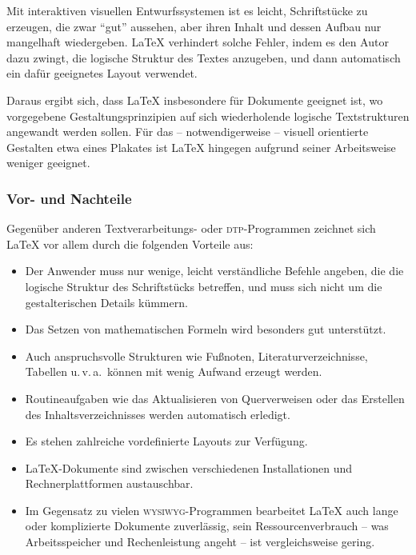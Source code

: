 Mit interaktiven visuellen Entwurfssystemen ist es leicht,  
Schriftstücke zu erzeugen, die zwar \enquote{gut} aussehen,
aber ihren Inhalt und dessen Aufbau nur mangelhaft wiedergeben.
\LaTeX{} verhindert solche
Fehler, indem es den Autor dazu zwingt, die logische
Struktur des Textes anzugeben, und dann automatisch ein dafür
geeignetes Layout verwendet.

Daraus ergibt sich, dass \LaTeX{} insbesondere für Dokumente geeignet 
ist, wo vorgegebene Gestaltungsprinzipien auf sich wiederholende
logische Textstrukturen angewandt werden sollen. 
Für das -- notwendigerweise -- visuell orientierte Gestalten
etwa eines Plakates ist \LaTeX{} hingegen 
aufgrund seiner Arbeitsweise weniger geeignet.

\subsubsection{Vor- und Nachteile}

Gegenüber anderen Textverarbeitungs- oder \textsc{dtp}-Programmen 
zeichnet sich \LaTeX{} vor allem durch die folgenden Vorteile aus:

\begin{itemize}
\item Der Anwender muss nur wenige, leicht verständliche Befehle
  angeben, die die logische Struktur des Schriftstücks
  betreffen, und muss sich nicht um die gestalterischen Details
  kümmern.
\item Das Setzen von mathematischen Formeln wird besonders gut
  unterstützt.
\item Auch anspruchsvolle Strukturen wie Fußnoten, Literaturverzeichnisse,
  Tabellen u.\,v.\,a.\  können mit wenig Aufwand erzeugt werden.
\item Routineaufgaben wie das Aktualisieren von Querverweisen
 oder das Erstellen des Inhaltsverzeichnisses 
 werden automatisch erledigt.
\item Es stehen zahlreiche vordefinierte Layouts zur Verfügung.
\item \LaTeX-Dokumente sind zwischen verschiedenen Installationen und
 Rechnerplattformen austauschbar.
\item Im Gegensatz zu vielen \textsc{wysiwyg}-Programmen bearbeitet \LaTeX{} auch
  lange oder komplizierte Dokumente zuverlässig, sein Ressourcenverbrauch -- was Arbeitsspeicher und Rechenleistung angeht -- ist vergleichsweise
  gering.
\end{itemize}


